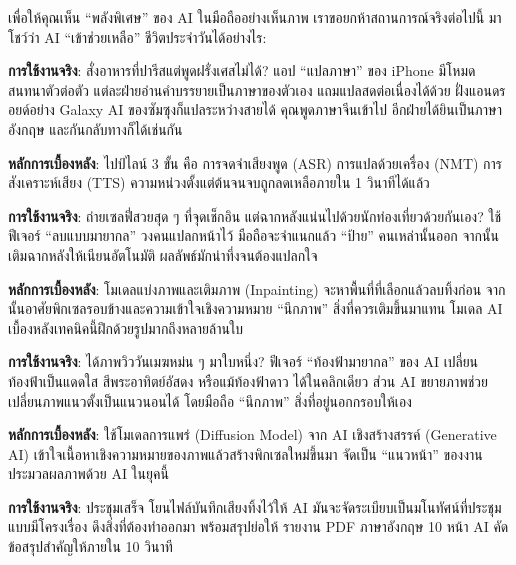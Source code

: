 
เพื่อให้คุณเห็น “พลังพิเศษ” ของ AI ในมือถืออย่างเห็นภาพ เราขอยกห้าสถานการณ์จริงต่อไปนี้ มาโชว์ว่า AI “เข้าช่วยเหลือ” ชีวิตประจำวันได้อย่างไร:


\textbf{การใช้งานจริง}: สั่งอาหารที่ปารีสแต่พูดฝรั่งเศสไม่ได้? แอป “แปลภาษา” ของ iPhone มีโหมดสนทนาตัวต่อตัว แต่ละฝ่ายอ่านคำบรรยายเป็นภาษาของตัวเอง แถมแปลสดต่อเนื่องได้ด้วย ฝั่งแอนดรอยด์อย่าง Galaxy AI ของซัมซุงก็แปลระหว่างสายได้ คุณพูดภาษาจีนเข้าไป อีกฝ่ายได้ยินเป็นภาษาอังกฤษ และกันกลับทางก็ได้เช่นกัน

\textbf{หลักการเบื้องหลัง}: ไปป์ไลน์ 3 ขั้น คือ การจดจำเสียงพูด (ASR) การแปลด้วยเครื่อง (NMT) การสังเคราะห์เสียง (TTS) ความหน่วงตั้งแต่ต้นจนจบถูกลดเหลือภายใน 1 วินาทีได้แล้ว


\textbf{การใช้งานจริง}: ถ่ายเซลฟี่สวยสุด ๆ ที่จุดเช็กอิน แต่ฉากหลังแน่นไปด้วยนักท่องเที่ยวด้วยกันเอง? ใช้ฟีเจอร์ “ลบแบบมายากล” วงคนแปลกหน้าไว้ มือถือจะจำแนกแล้ว “ป้าย” คนเหล่านั้นออก จากนั้นเติมฉากหลังให้เนียนอัตโนมัติ ผลลัพธ์มักน่าทึ่งจนต้องแปลกใจ

\textbf{หลักการเบื้องหลัง}: โมเดลแบ่งภาพและเติมภาพ (Inpainting) จะหาพื้นที่ที่เลือกแล้วลบทิ้งก่อน จากนั้นอาศัยพิกเซลรอบข้างและความเข้าใจเชิงความหมาย “นึกภาพ” สิ่งที่ควรเติมขึ้นมาแทน โมเดล AI เบื้องหลังเทคนิคนี้ฝึกด้วยรูปมากถึงหลายล้านใบ


\textbf{การใช้งานจริง}: ได้ภาพวิววันเมฆหม่น ๆ มาใบหนึ่ง? ฟีเจอร์ “ท้องฟ้ามายากล” ของ AI เปลี่ยนท้องฟ้าเป็นแดดใส สีพระอาทิตย์อัสดง หรือแม้ท้องฟ้าดาว ได้ในคลิกเดียว ส่วน AI ขยายภาพช่วยเปลี่ยนภาพแนวตั้งเป็นแนวนอนได้ โดยมือถือ “นึกภาพ” สิ่งที่อยู่นอกกรอบให้เอง

\textbf{หลักการเบื้องหลัง}: ใช้โมเดลการแพร่ (Diffusion Model) จาก AI เชิงสร้างสรรค์ (Generative AI) เข้าใจเนื้อหาเชิงความหมายของภาพแล้วสร้างพิกเซลใหม่ขึ้นมา จัดเป็น “แนวหน้า” ของงานประมวลผลภาพด้วย AI ในยุคนี้


\textbf{การใช้งานจริง}: ประชุมเสร็จ โยนไฟล์บันทึกเสียงทิ้งไว้ให้ AI มันจะจัดระเบียบเป็นมโนทัศน์ที่ประชุมแบบมีโครงเรื่อง ดึงสิ่งที่ต้องทำออกมา พร้อมสรุปย่อให้ รายงาน PDF ภาษาอังกฤษ 10 หน้า AI คัดข้อสรุปสำคัญให้ภายใน 10 วินาที

